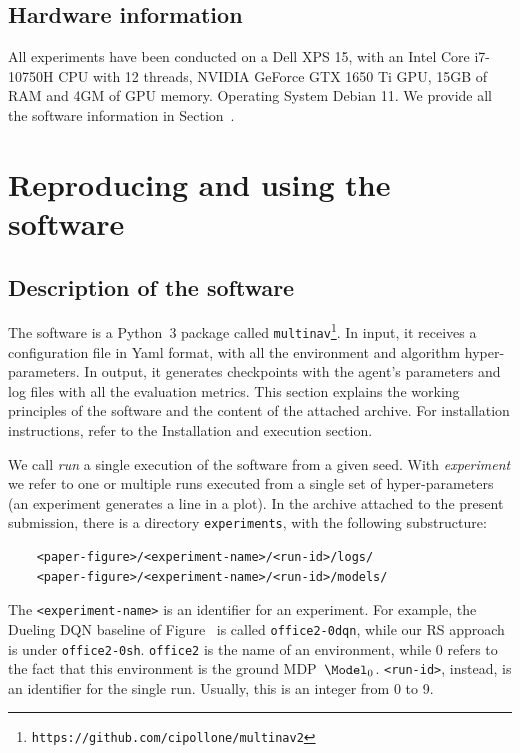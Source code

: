 \subsection{Hardware information}
All experiments have been conducted on a Dell XPS 15, with an Intel Core i7-10750H CPU with 12 threads,
NVIDIA GeForce GTX 1650 Ti GPU, 15GB of RAM and 4GM of GPU memory.
Operating System Debian 11. We provide all the software information in Section~.

\section{Reproducing and using the software}
\label{sec:using}
\subsection{Description of the software}

The software is a Python~3 package called \texttt{multinav}\footnote{\texttt{https://github.com/cipollone/multinav2}}.
In input, it receives a configuration file in Yaml format, with all the environment and algorithm hyper-parameters.
In output, it generates checkpoints with the agent's parameters and log files with all the evaluation metrics.
This section explains the working principles of the software and the content of the attached archive.
For installation instructions, refer to the Installation and execution section.

We call \emph{run} a single execution of the software from a given seed.
With \emph{experiment} we refer to one or multiple runs executed from a single set of hyper-parameters
(an experiment generates a line in a plot).
In the archive attached to the present submission, there is a directory \texttt{experiments},
with the following substructure:
\begin{verbatim}
	<paper-figure>/<experiment-name>/<run-id>/logs/
	<paper-figure>/<experiment-name>/<run-id>/models/
\end{verbatim}
The \verb|<experiment-name>| is an identifier for an experiment.
For example, the Dueling DQN baseline of Figure~ is called 
\texttt{office2-0dqn}, while our RS approach is under \texttt{office2-0sh}.
\texttt{office2} is the name of an environment, while 0 refers to the fact that this
environment is the ground MDP~$\Model_0$.
\verb|<run-id>|, instead, is an identifier for the single run.
Usually, this is an integer from 0 to 9.

